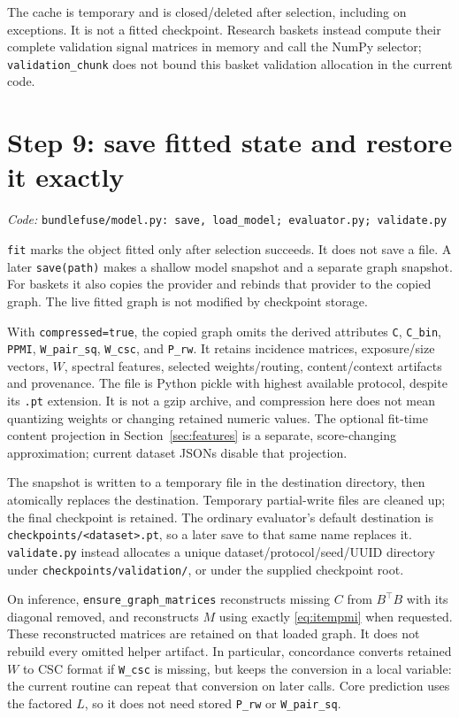 \documentclass[11pt,a4paper]{article}
\newcommand{\code}[1]{\nolinkurl{#1}}
\newcommand{\src}[1]{\par\begingroup\raggedright\textit{Code: }\code{#1}\par\endgroup}
\numberwithin{equation}{section}
\begin{document}
The cache is temporary and is closed/deleted after selection, including on exceptions.
It is not a fitted checkpoint. Research baskets instead compute their complete validation
signal matrices in memory and call the NumPy selector; \code{validation_chunk} does not
bound this basket validation allocation in the current code.

\section{Step 9: save fitted state and restore it exactly}\label{sec:checkpoint}
\src{bundlefuse/model.py: save, load_model; evaluator.py; validate.py}
\code{fit} marks the object fitted only after selection succeeds. It does not save a file.
A later \code{save(path)} makes a shallow model snapshot and a separate graph snapshot.
For baskets it also copies the provider and rebinds that provider to the copied graph.
The live fitted graph is not modified by checkpoint storage.

With \code{compressed=true}, the copied graph omits the derived attributes
\code{C}, \code{C_bin}, \code{PPMI}, \code{W_pair_sq}, \code{W_csc}, and \code{P_rw}.
It retains incidence matrices, exposure/size vectors, $W$, spectral features, selected
weights/routing, content/context artifacts and provenance. The file is Python pickle
with highest available protocol, despite its \code{.pt} extension. It is not a gzip archive,
and compression here does not mean quantizing weights or changing retained numeric values.
The optional fit-time content projection in Section~\ref{sec:features} is a separate,
score-changing approximation; current dataset JSONs disable that projection.

The snapshot is written to a temporary file in the destination directory, then atomically
replaces the destination. Temporary partial-write files are cleaned up; the final checkpoint
is retained. The ordinary evaluator's default destination is
\code{checkpoints/<dataset>.pt}, so a later save to that same name replaces it.
\code{validate.py} instead allocates a unique dataset/protocol/seed/UUID directory under
\code{checkpoints/validation/}, or under the supplied checkpoint root.

On inference, \code{ensure_graph_matrices} reconstructs missing $C$ from $B^\top B$
with its diagonal removed, and reconstructs $M$ using exactly \eqref{eq:itempmi} when
requested. These reconstructed matrices are retained on that loaded graph. It does not
rebuild every omitted helper artifact. In particular, concordance converts retained $W$
to CSC format if \code{W_csc} is missing, but keeps the conversion in a local variable:
the current routine can repeat that conversion on later calls. Core prediction uses the
factored $L$, so it does not need stored \code{P_rw} or \code{W_pair_sq}.
\end{document}
